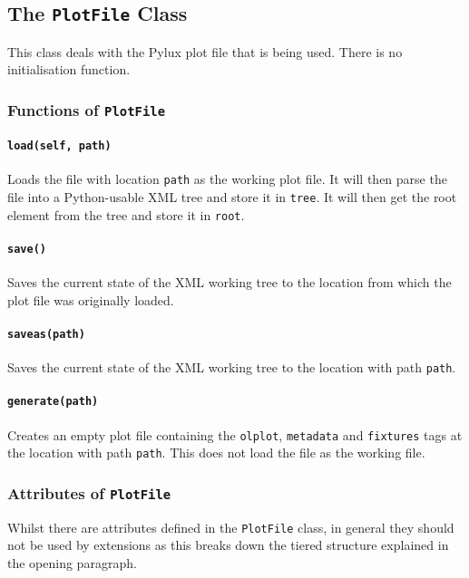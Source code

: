\documentclass[a4paper]{article}
\begin{document}
\subsection{The \texttt{PlotFile} Class}
This class deals with the Pylux plot file that is being used. There is no 
initialisation function.

\subsubsection{Functions of \texttt{PlotFile}}

\paragraph{\texttt{load(self, path)}}
Loads the file with location \texttt{path} as the working plot file. It will 
then parse the file into a Python-usable XML tree and store it in 
\texttt{tree}. It will then get the root element from the tree and store it in 
\texttt{root}.

\paragraph{\texttt{save()}}
Saves the current state of the XML working tree to the location from which 
the plot file was originally loaded.

\paragraph{\texttt{saveas(path)}}
Saves the current state of the XML working tree to the location with path 
\texttt{path}.

\paragraph{\texttt{generate(path)}}
Creates an empty plot file containing the \texttt{olplot}, \texttt{metadata} 
and \texttt{fixtures} tags at the location with path \texttt{path}. This does 
not load the file as the working file.

\subsubsection{Attributes of \texttt{PlotFile}}
Whilst there are attributes defined in the \texttt{PlotFile} class, in 
general they should not be used by extensions as this breaks down the 
tiered structure explained in the opening paragraph.
\end{document}
